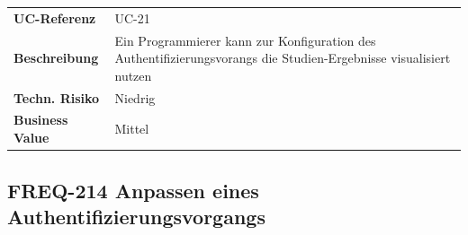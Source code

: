 \begin{longtable}[c]{@{}ll@{}}
\toprule
\begin{minipage}[t]{0.20\columnwidth}\raggedright\strut
\textbf{UC-Referenz}
\strut\end{minipage} &
\begin{minipage}[t]{0.74\columnwidth}\raggedright\strut
UC-21
\strut\end{minipage}\tabularnewline
\begin{minipage}[t]{0.20\columnwidth}\raggedright\strut
\textbf{Beschreibung}
\strut\end{minipage} &
\begin{minipage}[t]{0.74\columnwidth}\raggedright\strut
Ein Programmierer kann zur Konfiguration des Authentifizierungsvorangs
die Studien-Ergebnisse visualisiert nutzen
\strut\end{minipage}\tabularnewline
\begin{minipage}[t]{0.20\columnwidth}\raggedright\strut
\textbf{Techn. Risiko}
\strut\end{minipage} &
\begin{minipage}[t]{0.74\columnwidth}\raggedright\strut
Niedrig
\strut\end{minipage}\tabularnewline
\begin{minipage}[t]{0.20\columnwidth}\raggedright\strut
\textbf{Business Value}
\strut\end{minipage} &
\begin{minipage}[t]{0.74\columnwidth}\raggedright\strut
Mittel
\strut\end{minipage}\tabularnewline
\bottomrule
\end{longtable}

\subsection{FREQ-214 Anpassen eines
Authentifizierungsvorgangs}\label{freq-214-anpassen-eines-authentifizierungsvorgangs}

